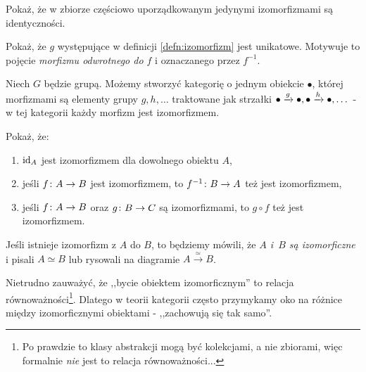 \begin{exc}
  Pokaż, że w zbiorze częściowo uporządkowanym jedynymi izomorfizmami są identyczności.
\end{exc}

\begin{exc}
  Pokaż, że $g$ występujące w definicji \ref{defn:izomorfizm} jest unikatowe. Motywuje to pojęcie \emph{morfizmu odwrotnego do $f$} i oznaczanego przez $f^{-1}$.
\end{exc}

\begin{exmp}
  Niech $G$ będzie grupą. Możemy stworzyć kategorię o jednym obiekcie $\bullet$, której morfizmami są elementy grupy $g, h,\dots$ traktowane jak strzałki $\bullet \xrightarrow{g} \bullet, \bullet \xrightarrow{h} \bullet, \dots$ - w tej kategorii każdy morfizm jest izomorfizmem.
\end{exmp}

\begin{exc}
  Pokaż, że:
  \begin{enumerate}
    \item $\mathrm{id}_{A}$ jest izomorfizmem dla dowolnego obiektu $A$,
    \item jeśli $f\colon A\to B$ jest izomorfizmem, to $f^{-1}\colon B\to A$ też jest izomorfizmem,
    \item jeśli $f\colon A\to B$ oraz $g\colon B\to C$ są izomorfizmami, to $g\circ f$ też jest izomorfizmem.
  \end{enumerate}
\end{exc}

\begin{defn}
  Jeśli istnieje izomorfizm z $A$ do $B$, to będziemy mówili, że \emph{$A$ i~$B$ są izomorficzne} i pisali $A\simeq B$ lub rysowali na diagramie $A\xrightarrow{~\simeq~} B$.
\end{defn}

\begin{remk}
  Nietrudno zauważyć, że ,,bycie obiektem izomorficznym'' to relacja równoważności\footnote{Po prawdzie to klasy abstrakcji mogą być kolekcjami, a nie zbiorami, więc formalnie \emph{nie} jest to relacja równoważności...}. Dlatego w teorii kategorii często przymykamy oko na różnice między izomorficznymi obiektami - ,,zachowują się tak samo''.
\end{remk}

